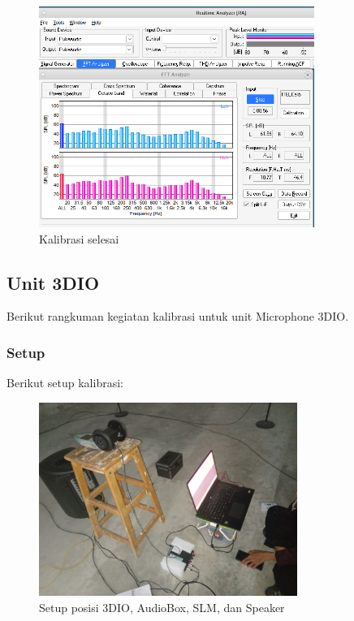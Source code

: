 \documentclass{article}
\begin{document}
\begin{itemize}
		\begin{figure}[H]
			\centering
			\includegraphics[width=0.8\textwidth,angle=0]{images/rta_fft}
			\caption{Kalibrasi selesai}
		\end{figure}

	\end{itemize}

	\newpage

	\subsection{Unit 3DIO}

	Berikut rangkuman kegiatan kalibrasi untuk unit Microphone 3DIO.

	\subsubsection{Setup}

	Berikut setup kalibrasi:

	\begin{figure}[H]
		\centering
		\includegraphics[width=0.75\textwidth,angle=0]{images/3dio_setup}
		\caption{Setup posisi 3DIO, AudioBox, SLM, dan Speaker}
	\end{figure}
\end{document}
